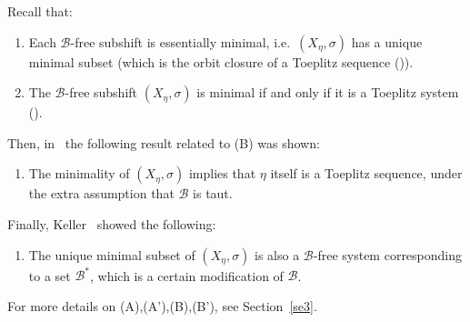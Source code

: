\documentclass[leqno,a4paper,12pt]{article}
\theoremstyle{definition}
\newcommand{\sB}{\mathscr{B}}
\begin{document}
Recall that:
\begin{enumerate}
\item[(A)]
Each $\sB$-free subshift is essentially minimal, i.e.\ $(X_\eta,\sigma)$ has a unique minimal subset (which is the orbit closure of a Toeplitz sequence ({\cite[Theorem A]{MR3803141}})).\label{ama}
\item[(B)]
The $\sB$-free subshift $(X_\eta,\sigma)$ is minimal if and only if it is a Toeplitz system ({\cite[Corollary 1.4]{MR3803141}}).
\end{enumerate}
Then, in~\cite{MR3947636} the following result related to (B) was shown:
\begin{enumerate}
\item[(B')]
The minimality of $(X_\eta,\sigma)$ implies that $\eta$ itself is a Toeplitz sequence, under the extra assumption that $\mathscr{B}$ is taut.
\end{enumerate}
Finally, Keller~\cite{MR4280951} showed the following:
\begin{enumerate}
\item[(A')]
The unique minimal subset of $(X_\eta,\sigma)$ is also a $\mathscr{B}$-free system corresponding to a set $\mathscr{B}^*$, which is a certain modification of $\mathscr{B}$.
\end{enumerate}
For more details on (A),(A'),(B),(B'), see Section~\ref{se3}.
\end{document}
